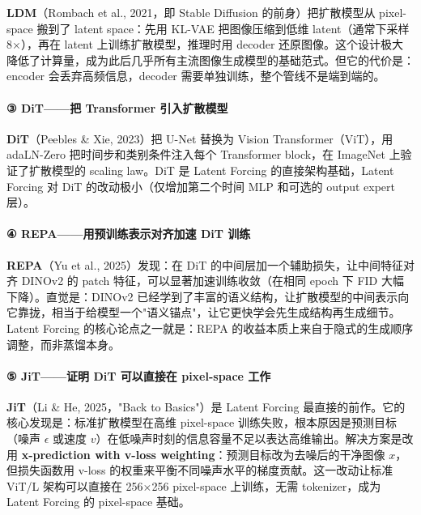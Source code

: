\textbf{LDM}（Rombach et al., 2021，即 Stable Diffusion 的前身）把扩散模型从 pixel-space 搬到了 latent space：先用 KL-VAE 把图像压缩到低维 latent（通常下采样 8×），再在 latent 上训练扩散模型，推理时用 decoder 还原图像。这个设计极大降低了计算量，成为此后几乎所有主流图像生成模型的基础范式。但它的代价是：encoder 会丢弃高频信息，decoder 需要单独训练，整个管线不是端到端的。

\paragraph{③ DiT——把 Transformer 引入扩散模型}

\textbf{DiT}（Peebles \& Xie, 2023）把 U-Net 替换为 Vision Transformer（ViT），用 adaLN-Zero 把时间步和类别条件注入每个 Transformer block，在 ImageNet 上验证了扩散模型的 scaling law。DiT 是 Latent Forcing 的直接架构基础，Latent Forcing 对 DiT 的改动极小（仅增加第二个时间 MLP 和可选的 output expert 层）。

\paragraph{④ REPA——用预训练表示对齐加速 DiT 训练}

\textbf{REPA}（Yu et al., 2025）发现：在 DiT 的中间层加一个辅助损失，让中间特征对齐 DINOv2 的 patch 特征，可以显著加速训练收敛（在相同 epoch 下 FID 大幅下降）。直觉是：DINOv2 已经学到了丰富的语义结构，让扩散模型的中间表示向它靠拢，相当于给模型一个"语义锚点"，让它更快学会先生成结构再生成细节。Latent Forcing 的核心论点之一就是：REPA 的收益本质上来自于隐式的生成顺序调整，而非蒸馏本身。

\paragraph{⑤ JiT——证明 DiT 可以直接在 pixel-space 工作}

\textbf{JiT}（Li \& He, 2025，"Back to Basics"）是 Latent Forcing 最直接的前作。它的核心发现是：标准扩散模型在高维 pixel-space 训练失败，根本原因是预测目标（噪声 $\epsilon$ 或速度 $v$）在低噪声时刻的信息容量不足以表达高维输出。解决方案是改用 \textbf{x-prediction with v-loss weighting}：预测目标改为去噪后的干净图像 $x$，但损失函数用 v-loss 的权重来平衡不同噪声水平的梯度贡献。这一改动让标准 ViT/L 架构可以直接在 256×256 pixel-space 上训练，无需 tokenizer，成为 Latent Forcing 的 pixel-space 基础。

